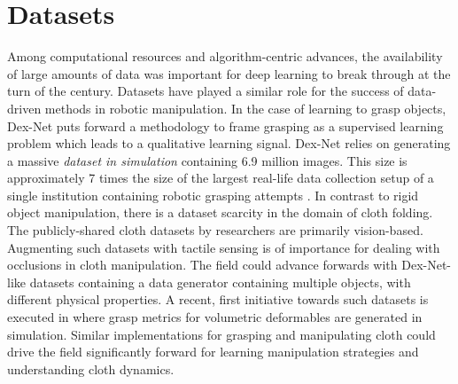 \documentclass[\home/main.tex]{subfiles}
\begin{document}
\section{Datasets}
Among computational resources and algorithm-centric advances, the availability of large amounts of data was important for deep learning to break through at the turn of the century. Datasets have played a similar role for the success of data-driven methods in robotic manipulation. In the case of learning to grasp objects, Dex-Net \autocite{dexnet2} puts forward a methodology to frame grasping as a supervised learning problem which leads to a qualitative learning signal. Dex-Net relies on generating a massive \emph{dataset in simulation} containing 6.9 million images. This size is approximately 7 times the size of the largest real-life data collection setup of a single institution containing robotic grasping attempts \autocite{Levine2016}. In contrast to rigid object manipulation, there is a dataset scarcity in the domain of cloth folding. The publicly-shared cloth datasets by researchers are primarily vision-based. Augmenting such datasets with tactile sensing is of importance for dealing with occlusions in cloth manipulation. The field could advance forwards with Dex-Net-like datasets containing a data generator containing multiple objects, with different physical properties. A recent, first initiative towards such datasets is executed in \textcite{DefGraspSim} where grasp metrics for volumetric deformables are generated in simulation. Similar implementations for grasping and manipulating cloth could drive the field significantly forward for learning manipulation strategies and understanding cloth dynamics. 
\end{document}
